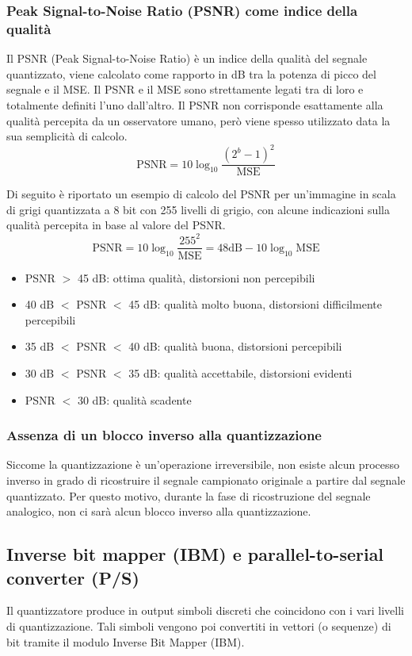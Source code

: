 \subsubsection*{Peak Signal-to-Noise Ratio (PSNR) come indice della qualità}
Il PSNR (Peak Signal-to-Noise Ratio) è un indice della qualità del segnale quantizzato, viene calcolato come rapporto
in dB tra la potenza di picco del segnale e il MSE. Il PSNR e il MSE sono strettamente legati tra di loro e totalmente
definiti l'uno dall'altro.
Il PSNR non corrisponde esattamente alla qualità percepita da un osservatore umano, però viene spesso utilizzato data
la sua semplicità di calcolo.
\[\text{PSNR} = 10 \log_{10} \frac{\left( 2^b - 1\right)^2}{\text{MSE}}\]

\noindent
Di seguito è riportato un esempio di calcolo del PSNR per un'immagine in scala di grigi quantizzata a 8 bit con 255
livelli di grigio, con alcune indicazioni sulla qualità percepita in base al valore del PSNR.
\[\text{PSNR} = 10 \log_{10} \frac{255^2}{\text{MSE}} = 48 \text{dB} - 10 \log_{10} \text{MSE}\]
\begin{itemize}
	\item PSNR \(>\) 45 dB: ottima qualità, distorsioni non percepibili
	\item 40 dB \(<\) PSNR \(<\) 45 dB: qualità molto buona, distorsioni difficilmente percepibili
	\item 35 dB \(<\) PSNR \(<\) 40 dB: qualità buona, distorsioni percepibili
	\item 30 dB \(<\) PSNR \(<\) 35 dB: qualità accettabile, distorsioni evidenti
	\item PSNR \(<\) 30 dB: qualità scadente
\end{itemize}

\subsubsection*{Assenza di un blocco inverso alla quantizzazione}
Siccome la quantizzazione è un'operazione irreversibile, non esiste alcun processo inverso in grado di ricostruire
il segnale campionato originale a partire dal segnale quantizzato. Per questo motivo, durante la fase di ricostruzione
del segnale analogico, non ci sarà alcun blocco inverso alla quantizzazione.

\subsection{Inverse bit mapper (IBM) e parallel-to-serial converter (P/S)}
Il quantizzatore produce in output simboli discreti che coincidono con i vari livelli di quantizzazione. Tali simboli
vengono poi convertiti in vettori (o sequenze) di bit tramite il modulo Inverse Bit Mapper (IBM).


